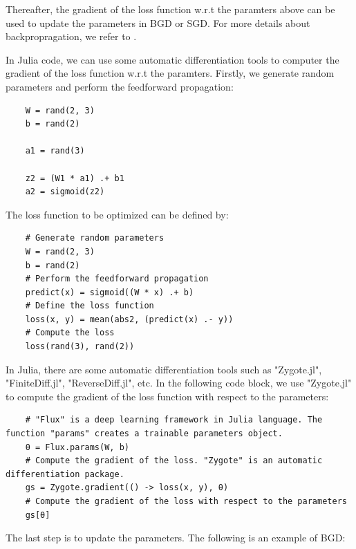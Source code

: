 \documentclass[
	parskip, 			   %
	twoside, 			   %
	DIV=14, 			   %
	BCOR=15.0mm, 		   %
	headsepline, 		   %
	open=right, 		   %
	captions=tableheading, %
	bibliography=totoc,    %
	numbers=noenddot       %
]{scrreprt}
\begin{document}
Thereafter, the gradient of the loss function w.r.t the paramters above can be used to update the parameters in BGD or SGD. For more details about backpropragation, we refer to \cite{nielsen2015neural}.

In Julia code, we can use some automatic differentiation tools to computer the gradient of the loss function w.r.t the paramters. Firstly, we generate random parameters and perform the feedforward propagation:

\begin{verbatim}
    W = rand(2, 3)
    b = rand(2)
    
    a1 = rand(3)

    z2 = (W1 * a1) .+ b1
    a2 = sigmoid(z2)
\end{verbatim}

The loss function to be optimized can be defined by:

\begin{verbatim}
    # Generate random parameters
    W = rand(2, 3)
    b = rand(2)
    # Perform the feedforward propagation
    predict(x) = sigmoid((W * x) .+ b)
    # Define the loss function
    loss(x, y) = mean(abs2, (predict(x) .- y))
    # Compute the loss
    loss(rand(3), rand(2))
\end{verbatim}

In Julia, there are some automatic differentiation tools such as "Zygote.jl", "FiniteDiff.jl", "ReverseDiff.jl", etc. In the following code block, we use "Zygote.jl" \cite{Zygote.jl-2018} to compute the gradient of the loss function with respect to the parameters:

\begin{verbatim}
    # "Flux" is a deep learning framework in Julia language. The function "params" creates a trainable parameters object.
    θ = Flux.params(W, b)
    # Compute the gradient of the loss. "Zygote" is an automatic differentiation package.
    gs = Zygote.gradient(() -> loss(x, y), θ)
    # Compute the gradient of the loss with respect to the parameters
    gs[θ]
\end{verbatim}

The last step is to update the parameters. The following is an example of BGD:
\end{document}
